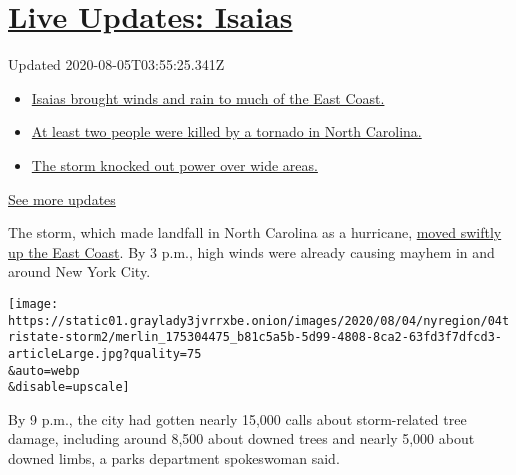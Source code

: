 \hypertarget{live-updates-isaias}{%
\section{\texorpdfstring{\href{https://www.nytimes3xbfgragh.onion/2020/08/04/us/isaias-storm-updates.html?action=click\&pgtype=Article\&state=default\&region=MAIN_CONTENT_1\&context=storylines_live_updates}{Live
Updates: Isaias}}{Live Updates: Isaias}}\label{live-updates-isaias}}

Updated 2020-08-05T03:55:25.341Z

\begin{itemize}
\tightlist
\item
  \href{https://www.nytimes3xbfgragh.onion/2020/08/04/us/isaias-storm-updates.html?action=click\&pgtype=Article\&state=default\&region=MAIN_CONTENT_1\&context=storylines_live_updates\#link-38d68049}{Isaias
  brought winds and rain to much of the East Coast.}
\item
  \href{https://www.nytimes3xbfgragh.onion/2020/08/04/us/isaias-storm-updates.html?action=click\&pgtype=Article\&state=default\&region=MAIN_CONTENT_1\&context=storylines_live_updates\#link-7961bdbc}{At
  least two people were killed by a tornado in North Carolina.}
\item
  \href{https://www.nytimes3xbfgragh.onion/2020/08/04/us/isaias-storm-updates.html?action=click\&pgtype=Article\&state=default\&region=MAIN_CONTENT_1\&context=storylines_live_updates\#link-3480f4a1}{The
  storm knocked out power over wide areas.}
\end{itemize}

\href{https://www.nytimes3xbfgragh.onion/2020/08/04/us/isaias-storm-updates.html?action=click\&pgtype=Article\&state=default\&region=MAIN_CONTENT_1\&context=storylines_live_updates}{See
more updates}

The storm, which made landfall in North Carolina as a hurricane,
\href{https://www.nytimes3xbfgragh.onion/2020/08/04/us/isaias-storm-updates.html?action=click\&module=Top\%20Stories\&pgtype=Homepage\#link-34e5d4e4}{moved
swiftly up the East Coast}. By 3 p.m., high winds were already causing
mayhem in and around New York City.

\texttt{[image: https://static01.graylady3jvrrxbe.onion/images/2020/08/04/nyregion/04tristate-storm2/merlin\_175304475\_b81c5a5b-5d99-4808-8ca2-63fd3f7dfcd3-articleLarge.jpg?quality=75\\\&auto=webp\\\&disable=upscale]}

By 9 p.m., the city had gotten nearly 15,000 calls about storm-related
tree damage, including around 8,500 about downed trees and nearly 5,000
about downed limbs, a parks department spokeswoman said.

